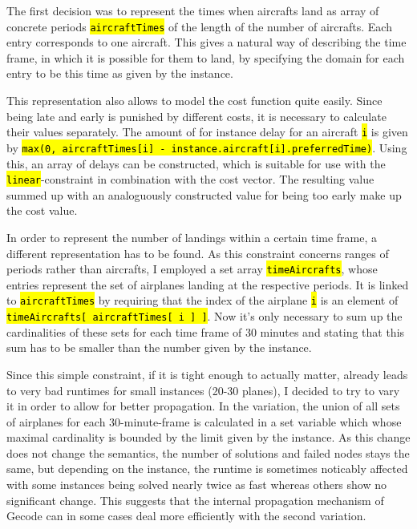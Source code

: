 \documentclass[,%
			paper=a4,%
			DIV12,
			liststotoc,
			bibtotoc,
			draft=false,%
			numbers=noendperiod
			]{scrartcl}
\newcommand{\ilc}[1]{\hl{\texttt{#1}}}
\newcommand{\mymarginnote}[1]{\marginnote{\footnotesize{#1}}}
\begin{document}
\mymarginnote{\Ctime}
The first decision was to represent the times when aircrafts land as array of concrete periods \ilc{aircraftTimes} of the length of the number of aircrafts. Each entry corresponds to one aircraft.
This gives a natural way of describing the time frame, in which it is possible for them to land, by specifying the domain for each entry to be this time as given by the instance.

\mymarginnote{\Ccost}
This representation also allows to model the cost function quite easily.
Since being late and early is punished by different costs, it is necessary to calculate their values separately.
The amount of for instance delay for an aircraft \ilc{i} is given by \ilc{max(0, aircraftTimes[i] - instance.aircraft[i].preferredTime)}.
Using this, an array of delays can be constructed, which is suitable for use with the \ilc{linear}-constraint in combination with the cost vector.
The resulting value summed up with an analoguously constructed value for being too early make up the cost value.

\mymarginnote{\Clandings}
In order to represent the number of landings within a certain time frame, a different representation has to be found.
As this constraint concerns ranges of periods rather than aircrafts, I employed a set array \ilc{timeAircrafts}, whose entries represent the set of airplanes landing at the respective periods.
It is linked to \ilc{aircraftTimes} by requiring that the index of the airplane \ilc{i} is an element of \ilc{timeAircrafts[ aircraftTimes[ i ] ]}.
Now it's only necessary to sum up the cardinalities of these sets for each time frame of 30 minutes and stating that this sum has to be smaller than the number given by the instance.

Since this simple constraint, if it is tight enough to actually matter, already leads to very bad runtimes for small instances (20-30 planes), I decided to try to vary it in order to allow for better propagation.
In the variation, the union of all sets of airplanes for each 30-minute-frame is calculated in a set variable which whose maximal cardinality is bounded by the limit given by the instance.   
As this change does not change the semantics, the number of solutions and failed nodes stays the same, but depending on the instance, the runtime is sometimes noticably affected with some instances being solved nearly twice as fast whereas others show no significant change.
This suggests that the internal propagation mechanism of Gecode can in some cases deal more efficiently with the second variation.
\end{document}
